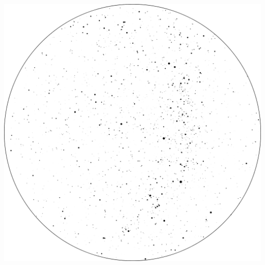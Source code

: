 \documentclass{SAS-class-skygen}
\begin{document}
	\vspace{0.5cm}
    \begin{center}
    \includegraphics[width=\textwidth]{./pics/sky_chart19.png}
    \end{center}
    
    
\end{document}
